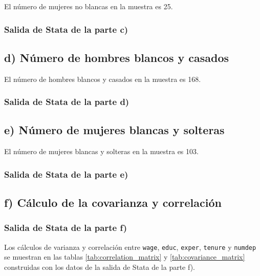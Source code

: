 \documentclass[12pt]{article}
\begin{document}
El número de mujeres no blancas en la muestra es 25.

\subsubsection*{Salida de Stata de la parte c)}



\subsection*{d) Número de hombres blancos y casados}

El número de hombres blancos y casados en la muestra es 168.

\subsubsection*{Salida de Stata de la parte d)}



\subsection*{e) Número de mujeres blancas y solteras}

El número de mujeres blancas y solteras en la muestra es 103.

\subsubsection*{Salida de Stata de la parte e)}



\subsection*{f) Cálculo de la covarianza y correlación}

\subsubsection*{Salida de Stata de la parte f)}



Los cálculos de varianza y correlación entre \texttt{wage}, \texttt{educ}, \texttt{exper}, \texttt{tenure} y \texttt{numdep} se muestran en las tablas \ref{tab:correlation_matrix} y \ref{tab:covariance_matrix} construidas con los datos de la salida de Stata de la parte f).
\end{document}
